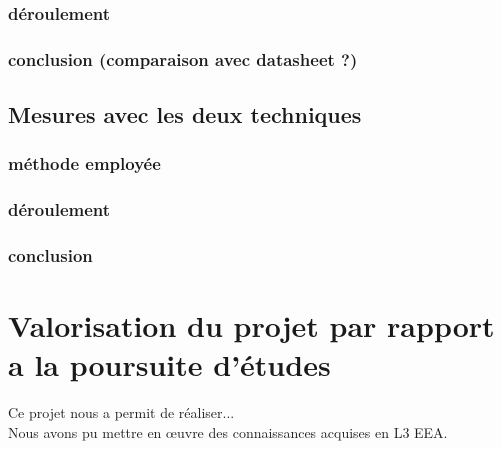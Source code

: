 \documentclass[a4paper]{report}
\begin{document}
	\subsection{déroulement}
	\subsection{conclusion (comparaison avec datasheet ?)}
	
	\section{Mesures avec les deux techniques}
	\subsection{méthode employée}
	\subsection{déroulement}
	\subsection{conclusion}
	

	\chapter{Valorisation du projet par rapport a la poursuite d'études}
	
		Ce projet nous a permit de réaliser... \\
		Nous avons pu mettre en œuvre des connaissances acquises en L3 EEA.\\
	
 
\end{document}
